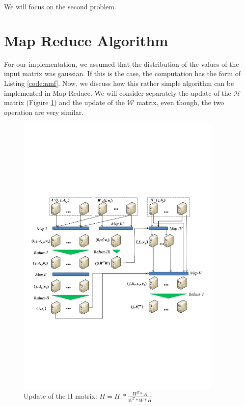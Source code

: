 \documentclass[a4paper,12pt]{article}
\begin{document}
We will focus on the second problem.

\section{Map Reduce Algorithm }
\label{mapreduce}

For our implementation, we assumed that the distribution of the values of the input matrix was gaussian.
If this is the case, the computation has the form of Listing \ref{code:nmf}.
Now, we discuss how this rather simple algorithm can be implemented in Map Reduce\cite{liu2010}.
We will consider separately the update of the $\mathcal{H}$ matrix (Figure \ref{fig:mapReduceScheme}) and the update of the $\mathcal{W}$ matrix, even though, the two operation are very similar.

\begin{center}
	\begin{figure}[h]
	\centering
	\includegraphics[width=0.9\textwidth]{./figures/mapReduceScheme}
	\caption{Update of the H matrix: $H = H.*\frac{W^T*A}{W^T*W*H}$ }
	\label{fig:mapReduceScheme}
	\end{figure}
\end{center}
\end{document}

